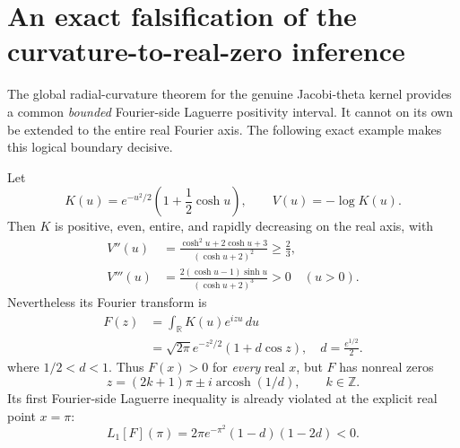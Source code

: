 \section{An exact falsification of the curvature-to-real-zero inference}
\label{sec:curvatureobstruction}

The global radial-curvature theorem for the genuine Jacobi-theta
kernel provides a common \emph{bounded} Fourier-side Laguerre
positivity interval. It cannot on its own be extended to
the entire real Fourier axis. The following exact example
makes this logical boundary decisive.

\begin{theorem}
\label{thm:coshcounter}
Let
\[
K(u)=e^{-u^2/2}\left(1+\frac12\cosh u\right),
\qquad V(u)=-\log K(u).
\]
Then $K$ is positive, even, entire, and rapidly decreasing
on the real axis, with
\begin{align}
V''(u)
&=\frac{\cosh^2u+2\cosh u+3}
        {(\cosh u+2)^2}\ge\frac23,\\
V'''(u)
&=\frac{2(\cosh u-1)\sinh u}
        {(\cosh u+2)^3}>0\quad(u>0).
\label{eq:coshcurv}
\end{align}
Nevertheless its Fourier transform is
\begin{align}\label{eq:coshfourier}
F(z)&=\int_{\mathbb R}K(u)e^{izu}\,du\nonumber\\
&=\sqrt{2\pi}e^{-z^2/2}(1+d\cos z),
\quad d=\frac{e^{1/2}}2.
\end{align}
where $1/2<d<1$. Thus $F(x)>0$ for \emph{every}
real $x$, but $F$ has nonreal zeros
\begin{equation}
z=(2k+1)\pi\pm i\operatorname{arcosh}(1/d),
\qquad k\in\mathbb Z.
\end{equation}
Its first Fourier-side Laguerre inequality is
already violated at the explicit real point $x=\pi$:
\begin{equation}\label{eq:coshlaguerre}
\boxed{
L_1[F](\pi)
=2\pi e^{-\pi^2}(1-d)(1-2d)<0.
}
\end{equation}
\end{theorem}

